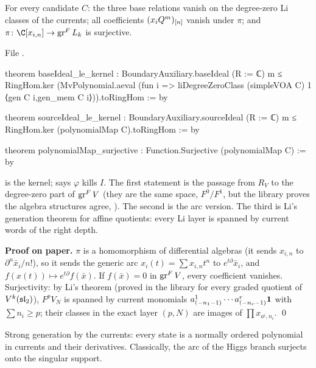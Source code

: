 \begin{theorem}\label{l20:thm:m0arc}
For every candidate $C$: the three base relations vanish on the degree-zero Li classes of the currents; all
coefficients $(x_iQ^m)_{[n]}$ vanish under $\pi$; and $\pi\colon\C[x_{i,n}]\to\ltwentygr L_k$ is surjective.
\end{theorem}
\noindent File .
\begin{leancode}
theorem baseIdeal_le_kernel : BoundaryAuxiliary.baseIdeal (R := ℂ) m ≤
    RingHom.ker (MvPolynomial.aeval (fun i =>
      liDegreeZeroClass (simpleVOA C) 1 ⟨gen C i,gen_mem C i⟩)).toRingHom := by

theorem sourceIdeal_le_kernel : BoundaryAuxiliary.sourceIdeal (R := ℂ) m ≤
    RingHom.ker (polynomialMap C).toRingHom := by

theorem polynomialMap_surjective : Function.Surjective (polynomialMap C) := by
\end{leancode}

\begin{dictionary}
 is the kernel;  says $\varphi$ kills $I$. The first statement is the passage from
$R_V$ to the degree-zero part of $\operatorname{gr}^F V$ (they are the same space, $F^0/F^1$, but the library proves the
algebra structures agree, ). The second is the arc version. The third is Li's generation
theorem for affine quotients: every Li layer is spanned by current words of the right depth.
\end{dictionary}

\textbf{Proof on paper.} $\pi$ is a homomorphism of differential algebras (it sends $x_{i,n}$ to
$\partial^n\bar x_i/n!$), so it sends the generic arc $x_i(t)=\sum x_{i,n}t^n$ to $e^{t\partial}\bar x_i$, and
$f(x(t))\mapsto e^{t\partial}f(\bar x)$. If $f(\bar x)=0$ in $\operatorname{gr}^F V$, every coefficient vanishes. Surjectivity:
by Li's theorem (proved in the library for every graded quotient of $V^k(\mathfrak{sl}_2)$), $F^pV_N$ is spanned by current
monomials $a^1_{(-n_1-1)}\cdots a^r_{(-n_r-1)}\mathbf{1}$ with $\sum n_i\ge p$; their classes in the exact layer
$(p,N)$ are images of $\prod x_{a^i,n_i}$. \qed

\begin{physics}
Strong generation by the currents: every state is a normally ordered polynomial in currents and their
derivatives. Classically, the arc of the Higgs branch surjects onto the singular support.
\end{physics}

